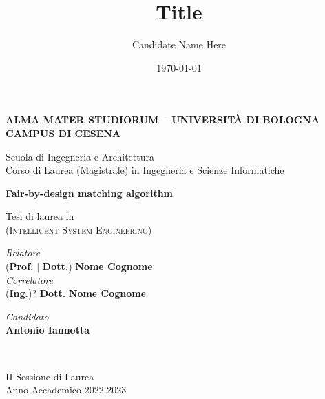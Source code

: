 \title{Title}
\author{Candidate Name Here}
\date{\today}

\begin{titlepage}
	\begin{center}
		
		\large
		\textbf{ALMA MATER STUDIORUM -- UNIVERSITÀ DI BOLOGNA \\ CAMPUS DI CESENA}
		\\
		\noindent\hrulefill
		\vspace{0.4cm}
		
		\Large
		Scuola di Ingegneria e Architettura \\
		Corso di Laurea (Magistrale) in Ingegneria e Scienze Informatiche
		
		\Huge
		\vspace{4cm}
		\textbf{
			Fair-by-design matching algorithm
		}
		
		\large
		\vspace{1cm}
		Tesi di laurea in 
		\\
		\textsc{(Intelligent System Engineering)}
		
		\vspace{5.5cm}
		\begin{minipage}[t]{0.64\textwidth}
			\begin{flushleft}
				\textit{Relatore} 
				\\ 
				(\textbf{Prof.} $\mid$ \textbf{Dott.}) \textbf{Nome Cognome}
				\\
				\vspace{0.4cm}
				\textit{Correlatore} 
				\\
				(\textbf{Ing.})? \textbf{Dott.} \textbf{Nome Cognome}
			\end{flushleft}
		\end{minipage}
		\begin{minipage}[t]{0.34\textwidth}
			\begin{flushright}
				\textit{Candidato} 
				\\ 
				\textbf{Antonio Iannotta}
			\end{flushright}
		\end{minipage}\\
		
		\vfill
		\noindent\hrulefill
		\vspace{0.3cm}
		\Large
		
		II Sessione di Laurea
		\\
		Anno Accademico 2022-2023
	\end{center}
\end{titlepage}
\restoregeometry
